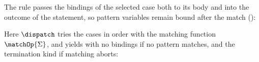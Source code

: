 The rule  passes the bindings of the selected case both to its body and into the
outcome of the statement, so pattern variables remain bound after the match ():
\begin{mathpar}
\small

\end{mathpar}
Here $\dispatch$ tries the cases in order with the matching function $\matchOp{\Sigma}$, and yields 
with no bindings if no pattern matches, and the termination kind if matching aborts:
\begin{defalign}

\end{defalign}
